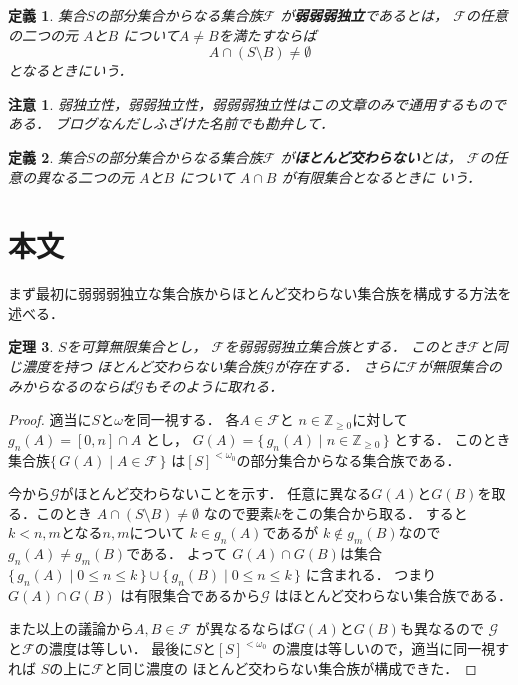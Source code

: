 \documentclass[leqno, a4paper, 12pt]{jsarticle}
\newtheorem{thm}{定理}
\newtheorem{df}[thm]{定義}
\newtheorem*{rmk}{注意}
\newcommand{\zz}{\mathbb{Z}}
\newcommand{\myomega}{\omega_{0}}
\begin{document}
\begin{df}
集合$S$の部分集合からなる集合族$\mathcal{F}$
が\textbf{弱弱弱独立}であるとは，
$\mathcal{F}$の任意の二つの元
$A$と$B$
について$A\neq B$を満たすならば
\[
A\cap (S\setminus B)\neq \emptyset
\]
となるときにいう．
\end{df}

\begin{rmk}
弱独立性，弱弱独立性，弱弱弱独立性はこの文章のみで通用するものである．
ブログなんだしふざけた名前でも勘弁して．
\end{rmk}


\begin{df}
集合$S$の部分集合からなる集合族$\mathcal{F}$
が\textbf{ほとんど交わらない}とは，
$\mathcal{F}$の任意の異なる二つの元
$A$と$B$
について
$A\cap B$
が有限集合となるときに
いう．
\end{df}



\section{本文}

まず最初に弱弱弱独立な集合族からほとんど交わらない集合族を構成する方法を述べる．
\begin{thm}\label{thm:jjj}
$S$を可算無限集合とし，
$\mathcal{F}$を弱弱弱独立集合族とする．
このとき$\mathcal{F}$と同じ濃度を持つ
ほとんど交わらない集合族$\mathcal{G}$が存在する．
さらに$\mathcal{F}$が無限集合のみからなるのならば$\mathcal{G}$もそのように取れる．
\end{thm}
\begin{proof}
適当に$S$と$\omega$を同一視する．
各$A\in \mathcal{F}$と
$n\in \zz_{\ge 0}$に対して
$g_{n}(A)=[0, n]\cap A$
とし，
$G(A)=\{\, g_{n}(A)\mid n\in \zz_{\ge 0}\, \}$
とする．
このとき集合族$\{\, G(A)\mid A\in \mathcal{F}\, \}$
は$[S]^{<\myomega}$の部分集合からなる集合族である．

今から$\mathcal{G}$がほとんど交わらないことを示す．
任意に異なる$G(A)$と$G(B)$を取る．このとき
$A\cap (S\setminus B)\neq \emptyset$
なので要素$k$をこの集合から取る．
すると$k<n, m$となる$n, m$について
$k\in g_{n}(A)$であるが
$k\not \in g_{m}(B)$なので
$g_{n}(A)\neq g_{m}(B)$である．
よって
$G(A)\cap G(B)$は集合
$\{\, g_{n}(A)\mid 0\le n\le k\, \}\cup \{\, g_{n}(B)\mid 0\le n\le k\, \}$
に含まれる．
つまり$G(A)\cap G(B)$
は有限集合であるから$\mathcal{G}$
はほとんど交わらない集合族である．

また以上の議論から$A, B\in \mathcal{F}$
が異なるならば$G(A)$と$G(B)$も異なるので
$\mathcal{G}$と$\mathcal{F}$の濃度は等しい．
最後に$S$と$[S]^{<\myomega}$
の濃度は等しいので，適当に同一視すれば
$S$の上に$\mathcal{F}$と同じ濃度の
ほとんど交わらない集合族が構成できた．
\end{proof}
\end{document}
